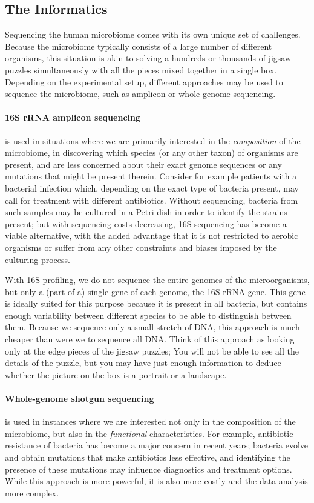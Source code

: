\begin{justify}
\subsection{The Informatics}

Sequencing the human microbiome comes with its own unique set of challenges. Because the microbiome typically consists of a large number of different organisms, this situation is akin to solving a hundreds or thousands of jigsaw puzzles simultaneously with all the pieces mixed together in a single box. Depending on the experimental setup, different approaches may be used to sequence the microbiome, such as amplicon or whole-genome sequencing.

\paragraph{16S rRNA amplicon sequencing} is used in situations where we are primarily  interested in the \emph{composition} of the microbiome, in discovering which species (or any other taxon) of organisms are present, and are less concerned about their exact genome sequences or any mutations that might be present therein. Consider for example patients with a bacterial infection which, depending on the exact type of bacteria present, may call for treatment with different antibiotics. Without sequencing, bacteria from such samples may be cultured in a Petri dish in order to identify the strains present; but with sequencing costs decreasing, 16S sequencing has become a viable alternative, with the added advantage that it is not restricted to aerobic organisms or suffer from any other constraints and biases imposed by the culturing process.

With 16S profiling, we do not sequence the entire genomes of the microorganisms, but only a (part of a) single gene of each genome, the 16S rRNA gene. This gene is ideally suited for this purpose because it is present in all bacteria, but contains enough variability between different species to be able to distinguish between them. Because we sequence only a small stretch of DNA, this approach is much cheaper than were we to sequence all DNA\@. Think of this approach as looking only at the edge pieces of the jigsaw puzzles; You will not be able to see all the details of the puzzle, but you may have just enough information to deduce whether the picture on the box is a portrait or a landscape.


\paragraph{Whole-genome shotgun sequencing} is used in instances where we are interested not only in the composition of the microbiome, but also in the \emph{functional} characteristics. For example, antibiotic resistance of bacteria has become a major concern in recent years; bacteria evolve and obtain mutations that make antibiotics less effective, and identifying the presence of these mutations may influence diagnostics and treatment options. While this approach is more powerful, it is also more costly and the data analysis more complex.



\end{justify}
